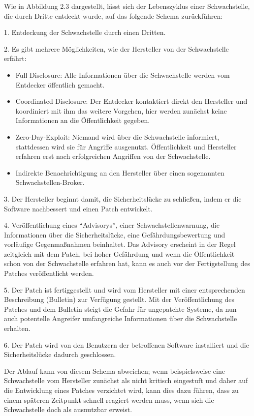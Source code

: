 \documentclass[12pt,oneside,a4paper,parskip,pointlessnumbers]{scrbook}
\begin{document}
  Wie in Abbildung 2.3 dargestellt, lässt sich der Lebenszyklus einer Schwachstelle, die durch Dritte entdeckt wurde, auf das folgende Schema zurückführen\cite{BSI3}:

  1. Entdeckung der Schwachstelle durch einen Dritten.

  2. Es gibt mehrere Möglichkeiten, wie der Hersteller von der Schwachstelle erfährt:
  \begin{itemize}
    \item \glqq Full Disclosure\grqq: Alle Informationen über die Schwachstelle werden vom Entdecker öffentlich gemacht.
    \item \glqq Coordinated Disclosure\grqq: Der Entdecker kontaktiert direkt den Hersteller und koordiniert mit ihm das weitere Vorgehen, hier werden zunächst keine Informationen an die Öffentlichkeit gegeben.
    \item \glqq Zero-Day-Exploit\grqq: Niemand wird über die Schwachstelle informiert, stattdessen wird sie für Angriffe ausgenutzt. Öffentlichkeit und Hersteller erfahren erst nach erfolgreichen Angriffen von der Schwachstelle.
    \item Indirekte Benachrichtigung an den Hersteller über einen sogenannten Schwachstellen-Broker. \end{itemize}
  3. Der Hersteller beginnt damit, die Sicherheitslücke zu schließen, indem er die Software nachbessert und einen Patch entwickelt.

  4. Veröffentlichung eines ``Advisorys'', einer Schwachstellenwarnung, die Informationen über die Sicherheitslücke, eine Gefährdungsbewertung und vorläufige Gegenmaßnahmen beinhaltet.
  Das Advisory erscheint in der Regel zeitgleich mit dem Patch, bei hoher Gefährdung und wenn die Öffentlichkeit schon von der Schwachstelle erfahren hat, kann es auch vor der Fertigstellung des Patches veröffentlicht werden.

  5. Der Patch ist fertiggestellt und wird vom Hersteller mit einer entsprechenden Beschreibung (Bulletin) zur Verfügung gestellt. Mit der Veröffentlichung des Patches und dem Bulletin steigt die Gefahr für ungepatchte Systeme, da nun auch potentelle Angreifer umfangreiche Informationen über die Schwachstelle
  erhalten.

  6. Der Patch wird von den Benutzern der betroffenen Software installiert und die Sicherheitslücke dadurch geschlossen.

  Der Ablauf kann von diesem Schema abweichen; wenn beispielsweise eine Schwachstelle vom Hersteller zunächst als nicht kritisch eingestuft und daher auf die Entwicklung eines Patches verzichtet wird, kann dies dazu führen, dass zu einem späteren Zeitpunkt schnell reagiert werden muss, wenn sich die Schwachstelle doch als ausnutzbar erweist. \cite{BSI3}
\end{document}
